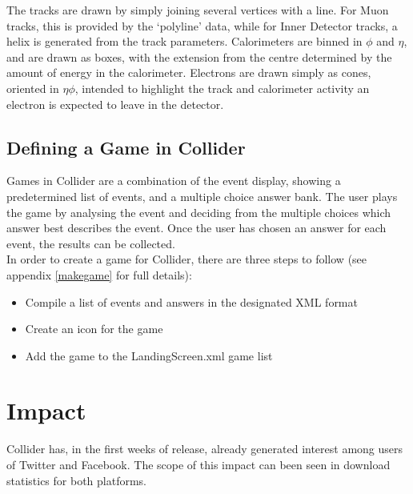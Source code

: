 \documentclass[12pt]{article}
\begin{document}
The tracks are drawn by simply joining several vertices with a line. For Muon tracks, this is provided by the `polyline' data, while for 
Inner Detector tracks, a helix is generated from the track parameters.
Calorimeters are binned in $\phi$ and $\eta$, and are drawn as boxes, with the extension from the centre determined by the amount of energy in the calorimeter.
Electrons are drawn simply as cones, oriented in $\eta\phi$, intended to highlight the track and calorimeter activity an electron is expected to leave in the detector. 

\subsection{Defining a Game in Collider}
Games in Collider are a combination of the event display, showing a predetermined list of events, and a multiple choice answer bank. 
The user plays the game by analysing the event and deciding from the multiple choices which answer best describes the event. Once the 
user has chosen an answer for each event, the results can be collected.
\\
In order to create a game for Collider, there are three steps to follow (see appendix \ref{makegame} for full details):
\begin{itemize}
\item Compile a list of events and answers in the designated XML format
\item Create an icon for the game
\item Add the game to the LandingScreen.xml game list
\end{itemize}

\section{Impact}

Collider has, in the first weeks of release, already generated interest among users of Twitter and Facebook. The scope of this impact can been seen in download statistics for both platforms.
\end{document}
